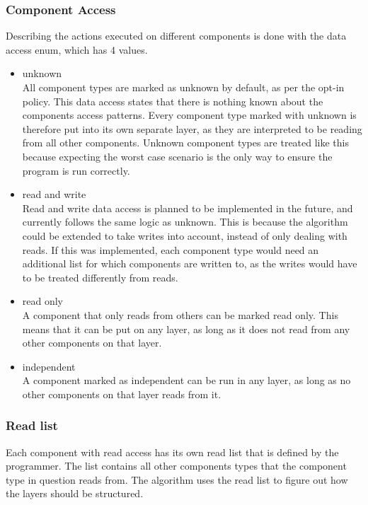 \subsubsection{Component Access}
\label{subsec:detailed_component_access_levels}
Describing the actions executed on different components is done with the data access enum, which has 4 values.

\begin{itemize}
    \item unknown\\
    All component types are marked as unknown by default, as per the opt-in policy.
    This data access states that there is nothing known about the components access patterns.
    Every component type marked with unknown is therefore put into its own separate layer, as they are interpreted to be reading from all other components.
    Unknown component types are treated like this because expecting the worst case scenario is the only way to ensure the program is run correctly.

    \item read and write\\
    Read and write data access is planned to be implemented in the future, and currently follows the same logic as unknown.
    This is because the algorithm could be extended to take writes into account, instead of only dealing with reads.
    If this was implemented, each component type would need an additional list for which components are written to,
    as the writes would have to be treated differently from reads.

    \item read only\\
    A component that only reads from others can be marked read only. This means that it can be put on any layer, as long
    as it does not read from any other components on that layer.

    \item independent\\
    A component marked as independent can be run in any layer, as long as no other components on that layer reads from it.
\end{itemize}

\subsubsection{Read list}
\label{subsec:detailed_read_list}
Each component with read access has its own read list that is defined by the programmer.
The list contains all other components types that the component type in question reads from.
The algorithm uses the read list to figure out how the layers should be structured.

